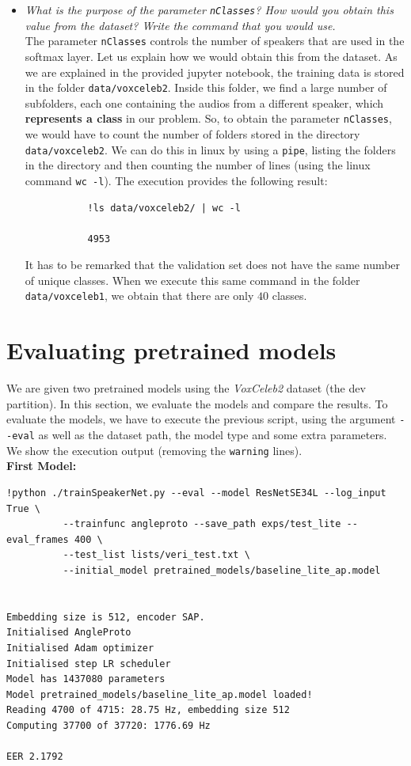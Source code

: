 \documentclass[a4paper]{article}
\def\inline{\lstinline[basicstyle=\ttfamily,keywordstyle={}]}
\begin{document}
\begin{itemize}
  \item \emph{What is the purpose of the parameter \inline{nClasses}? How would you obtain this value from the dataset? Write the command that you would use.}\\

        The parameter \inline{nClasses} controls the number of speakers that are used in the softmax layer. Let us explain how we would obtain this from the dataset. As we are explained in the provided jupyter notebook, the training data is stored in the folder \inline{data/voxceleb2}. Inside this folder, we find a large number of subfolders, each one containing the audios from a different speaker, which \textbf{represents a class} in our problem. So, to obtain the parameter \inline{nClasses}, we would have to count the number of folders stored in the directory \inline{data/voxceleb2}. We can do this in linux by using a \inline{pipe}, listing the folders in the directory and then counting the number of lines (using the linux command \inline{wc -l}). The execution provides the following result:

        \begin{verbatim}
           !ls data/voxceleb2/ | wc -l

           4953
        \end{verbatim}


        It has to be remarked that the validation set does not have the same number of unique classes. When we execute this same command in the folder \inline{data/voxceleb1}, we obtain that there are only \(40\) classes.

\end{itemize}


\section{Evaluating pretrained models}

We are given two pretrained models using the \emph{VoxCeleb2} dataset (the dev partition). In this section, we evaluate the models and compare the results. To evaluate the models, we have to execute the previous script, using the argument \inline{--eval} as well as the dataset path, the model type and some extra parameters. We show the execution output (removing the \inline{warning} lines).\\

\textbf{First Model:}\\
\begin{verbatim}
!python ./trainSpeakerNet.py --eval --model ResNetSE34L --log_input True \
          --trainfunc angleproto --save_path exps/test_lite --eval_frames 400 \
          --test_list lists/veri_test.txt \
          --initial_model pretrained_models/baseline_lite_ap.model


Embedding size is 512, encoder SAP.
Initialised AngleProto
Initialised Adam optimizer
Initialised step LR scheduler
Model has 1437080 parameters
Model pretrained_models/baseline_lite_ap.model loaded!
Reading 4700 of 4715: 28.75 Hz, embedding size 512
Computing 37700 of 37720: 1776.69 Hz

EER 2.1792
\end{verbatim}
\end{document}
